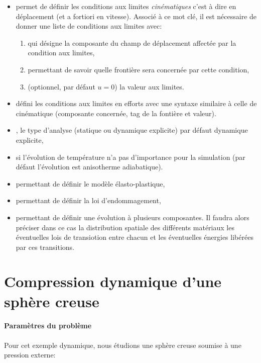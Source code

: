 \documentclass[10pt]{book}
\begin{document}
\begin{itemize}
\item {} permet de définir les conditions aux limites \emph{cinématiques} c'est à dire en déplacement (et a fortiori en vitesse). Associé à ce mot clé, il est nécessaire de donner une liste de conditions aux limites avec:
\begin{enumerate}
\item {} qui désigne la composante du champ de déplacement affectée par la condition aux limites,
\item {} permettant de savoir quelle frontière sera concernée par cette condition,
\item {} (optionnel, par défaut $u=0$) la valeur aux limites. 
\end{enumerate}
\item {} défini les conditions aux limites en efforts avec une syntaxe similaire à celle de cinématique (composante concernée, tag de la fontière et valeur).
\item {}, le type d'analyse (statique ou dynamique explicite) par défaut dynamique explicite,
\item {} si l'évolution de température n'a pas d'importance pour la simulation (par défaut l'évolution est anisotherme adiabatique).
\item {} permettant de définir le modèle élasto-plastique,
\item {} permettant de définir la loi d'endommagement,
\item {} permettant de définir une évolution à plusieurs composantes. Il faudra alors préciser dans ce cas la distribution spatiale des différents matériaux les éventuelles lois de transiotion entre chacun et les éventuelles énergies libérées par ces transitions.
\end{itemize}
\section{Compression dynamique d'une sphère creuse}\label{Section:Compression dynamique d'une sphère creuse}

\paragraph{Paramètres du problème} Pour cet exemple dynamique, nous étudions une sphère creuse soumise à une pression externe:
\end{document}
